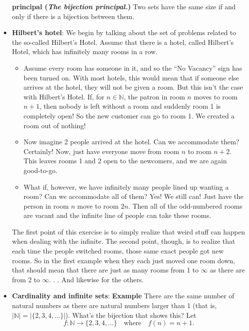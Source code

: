 \documentclass{report}
\begin{document}
\begin{itemize}
            \textbf{principal (\textit{The bijection principal.})} Two sets have the same size if and only if there is a bijection between them.
        \item \textbf{Hilbert's hotel}: We begin by talking about the set of problems related to the so-called Hilbert’s Hotel. Assume that there is a hotel, called Hilbert’s Hotel, which has infinitely many rooms in a row.
            \bigbreak \noindent 
            \begin{itemize}
                \item Assume every room has someone in it, and so the “No Vacancy” sign has been
                    turned on. With most hotels, this would mean that if someone else arrives at
                    the hotel, they will not be given a room. But this isn’t the case with Hilbert’s
                    Hotel. If, for \( n \in \mathbb{N} \), the patron in room \( n \) moves to room \( n + 1 \), then nobody
                    is left without a room and suddenly room 1 is completely open! So the new
                    customer can go to room 1. We created a room out of nothing!
                \item Now imagine 2 people arrived at the hotel. Can we accommodate them?
                    Certainly! Now, just have everyone move from room \( n \) to room \( n + 2 \). This
                    leaves rooms 1 and 2 open to the newcomers, and we are again good-to-go.

                \item What if, however, we have infinitely many people lined up wanting a room?
                    Can we accommodate all of them? Yes! We still can! Just have the person in
                    room \( n \) move to room \( 2n \). Then all of the odd-numbered rooms are vacant and
                    the infinite line of people can take these rooms.
            \end{itemize}
            The first point of this exercise is to simply realize that weird stuff can happen
            when dealing with the infinite. The second point, though, is to realize that each time
            the people switched rooms, those same exact people got new rooms. So in the first
            example when they each just moved one room down, that should mean that there
            are just as many rooms from 1 to $\infty$ as there are from 2 to $\infty$. . . And likewise for the
            others.
        \item \textbf{Cardinality and infinite sets}:
            \bigbreak \noindent 
            \textbf{Example} There are the same number of natural numbers as there are natural
            numbers larger than 1 (that is, \( |\mathbb{N}| = |\{2, 3, 4, \dots \}| \)). What’s the bijection that shows
            this? Let
            \[
                f : \mathbb{N} \to \{2, 3, 4, \dots \} \quad \text{where} \quad f(n) = n + 1.
            \]


\end{itemize}
\end{document}
